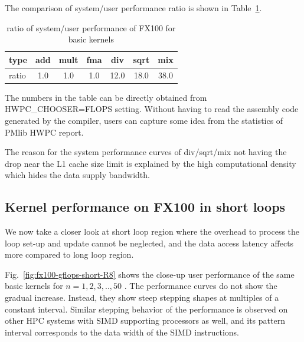 \documentclass[conference]{IEEEtran}
\begin{document}
The comparison of system/user performance ratio is shown in
Table~\ref{tab:ratio-system-user-fx100}.
\begin{table}[bt]
\centering
\small
\caption{ratio of system/user performance of FX100 for basic kernels}
\label{tab:ratio-system-user-fx100}
\begin{tabular}{l|c|c|c|c|c|c} \hline
type &	add	&	mult &	fma &	div &	sqrt &	mix \\ \hline
ratio &	1.0 &	1.0 &	1.0 &	12.0 &	18.0 &	38.0 \\ \hline 	
\end{tabular}
\end{table}
%
The numbers in the table can be
directly obtained from HWPC\_CHOOSER=FLOPS setting.
Without having to read the assembly code generated by the compiler,
users can capture some idea from the statistics of PMlib HWPC report.

The reason for the system performance curves of div/sqrt/mix
not having the drop near the L1 cache size limit
is explained by the high computational density which hides the
data supply bandwidth.


\subsection{Kernel performance on FX100 in short loops}
\label{subsection:short-kernels-fx100}

We now take a closer look at short loop region where
the overhead to process the loop set-up and update cannot be neglected,
and the data access latency affects more compared to long loop region.

Fig.~\ref{fig:fx100-gflops-short-R8}
shows the close-up user performance of the same basic kernels for
\begin{math}
n=1,2,3,..,50
\end{math}
.
%
The performance curves do not show the gradual increase. Instead, they
show steep stepping shapes at multiples of a constant interval.
Similar stepping behavior of the performance
is observed on other HPC systems with SIMD supporting processors as well,
and its pattern interval corresponds to the data width of the SIMD instructions.
\end{document}
